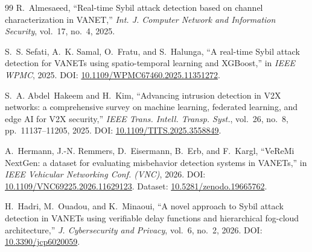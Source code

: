 \documentclass[conference]{IEEEtran}
\begin{document}
\begin{thebibliography}{99}
 R.~Almesaeed, ``Real-time Sybil attack detection based on channel characterization in VANET,'' \emph{Int. J. Computer Network and Information Security}, vol.~17, no.~4, 2025.

 S.~S. Sefati, A.~K. Samal, O.~Fratu, and S.~Halunga, ``A real-time Sybil attack detection for VANETs using spatio-temporal learning and XGBoost,'' in \emph{IEEE WPMC}, 2025. DOI: \url{10.1109/WPMC67460.2025.11351272}.

 S.~A. Abdel~Hakeem and H.~Kim, ``Advancing intrusion detection in V2X networks: a comprehensive survey on machine learning, federated learning, and edge AI for V2X security,'' \emph{IEEE Trans. Intell. Transp. Syst.}, vol.~26, no.~8, pp.~11137--11205, 2025. DOI: \url{10.1109/TITS.2025.3558849}.

 A.~Hermann, J.-N. Remmers, D.~Eisermann, B.~Erb, and F.~Kargl, ``VeReMi NextGen: a dataset for evaluating misbehavior detection systems in VANETs,'' in \emph{IEEE Vehicular Networking Conf. (VNC)}, 2026. DOI: \url{10.1109/VNC69225.2026.11629123}. Dataset: \url{10.5281/zenodo.19665762}.

 H.~Hadri, M.~Ouadou, and K.~Minaoui, ``A novel approach to Sybil attack detection in VANETs using verifiable delay functions and hierarchical fog-cloud architecture,'' \emph{J. Cybersecurity and Privacy}, vol.~6, no.~2, 2026. DOI: \url{10.3390/jcp6020059}.

\end{thebibliography}
\end{document}

